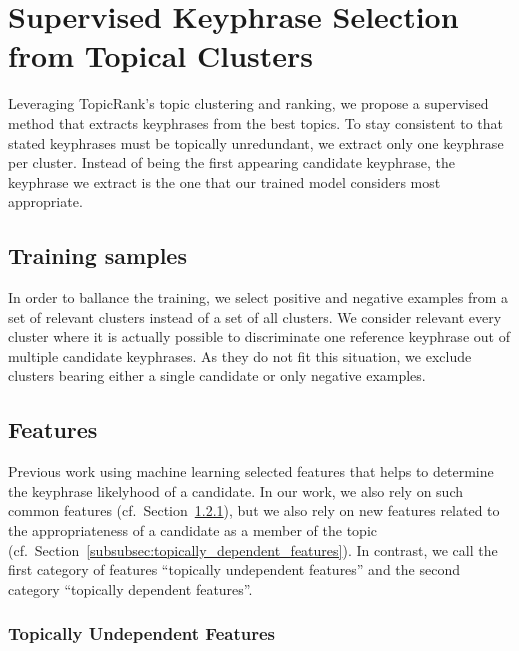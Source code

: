 \section{Supervised Keyphrase Selection\\from Topical Clusters}
\label{sec:supervised_keyphrase_selection_from_topical_clusters}
  Leveraging TopicRank's topic clustering and ranking, we propose a supervised
  method that extracts keyphrases from the best topics. To stay consistent to
   that stated keyphrases must be topically
  unredundant, we extract only one keyphrase per cluster. Instead of being the
  first appearing candidate keyphrase, the keyphrase we extract is the one that
  our trained model considers most appropriate.


  \subsection{Training samples}
  \label{subsec:training_samples}

    In order to ballance the training, we select positive and negative examples
    from a set of relevant clusters instead of a set of all clusters. We
    consider relevant every cluster where it is actually possible to
    discriminate one reference keyphrase out of multiple candidate keyphrases.
    As they do not fit this situation, we exclude clusters bearing either a
    single candidate or only negative examples.

  \subsection{Features}
  \label{subsec:features}
    Previous work using machine learning selected features that helps to
    determine the keyphrase likelyhood of a candidate. In our work, we also rely
    on such common features
    (cf.~Section~\ref{subsubsec:topically_undependent_features}), but we also
    rely on new features related to the appropriateness of a candidate as a
    member of the topic
    (cf.~Section~\ref{subsubsec:topically_dependent_features}). In contrast, we
    call the first category of features ``topically undependent features'' and
    the second category ``topically dependent features''.

    \subsubsection{Topically Undependent Features}
    \label{subsubsec:topically_undependent_features}

